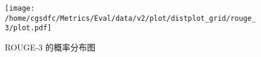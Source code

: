 \begin{figure}[H]%
\centering%
\texttt{[image: /home/cgsdfc/Metrics/Eval/data/v2/plot/distplot\_grid/rouge\_3/plot.pdf]}%
\caption{ROUGE{-}3 的概率分布图}%
\label{fig:ROUGE{-}3dist}%
\end{figure}